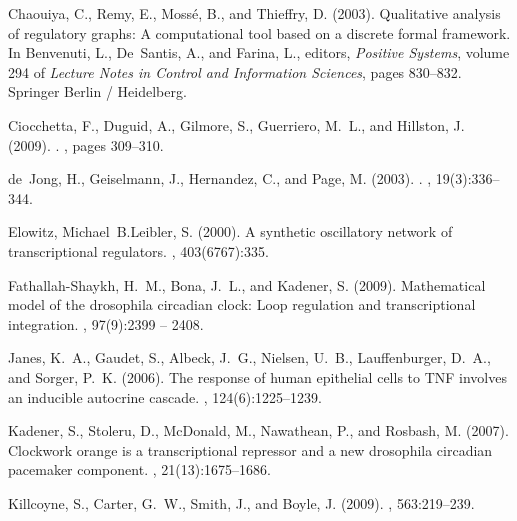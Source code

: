 \documentclass{bmcart}
\begin{document}
\clearpage
{}
\begin{thebibliography}{}

Chaouiya, C., Remy, E., Moss\'{e}, B., and Thieffry, D. (2003).
\newblock Qualitative analysis of regulatory graphs: A computational tool based
  on a discrete formal framework.
\newblock In Benvenuti, L., De~Santis, A., and Farina, L., editors, {\em
  Positive Systems}, volume 294 of {\em Lecture Notes in Control and
  Information Sciences}, pages 830--832. Springer Berlin / Heidelberg.

Ciocchetta, F., Duguid, A., Gilmore, S., Guerriero, M.~L., and Hillston, J.
  (2009).
.
,
  pages 309--310.

de~Jong, H., Geiselmann, J., Hernandez, C., and Page, M. (2003).
.
, 19(3):336--344.

Elowitz, Michael~B.Leibler, S. (2000).
\newblock A synthetic oscillatory network of transcriptional regulators.
, 403(6767):335.

Fathallah-Shaykh, H.~M., Bona, J.~L., and Kadener, S. (2009).
\newblock Mathematical model of the drosophila circadian clock: Loop regulation
  and transcriptional integration.
, 97(9):2399 -- 2408.

Janes, K.~A., Gaudet, S., Albeck, J.~G., Nielsen, U.~B., Lauffenburger, D.~A.,
  and Sorger, P.~K. (2006).
\newblock The response of human epithelial cells to {TNF} involves an inducible
  autocrine cascade.
, 124(6):1225--1239.

Kadener, S., Stoleru, D., McDonald, M., Nawathean, P., and Rosbash, M. (2007).
\newblock Clockwork orange is a transcriptional repressor and a new drosophila
  circadian pacemaker component.
, 21(13):1675--1686.

Killcoyne, S., Carter, G.~W., Smith, J., and Boyle, J. (2009).
, 563:219--239.


\end{thebibliography}
\end{document}
